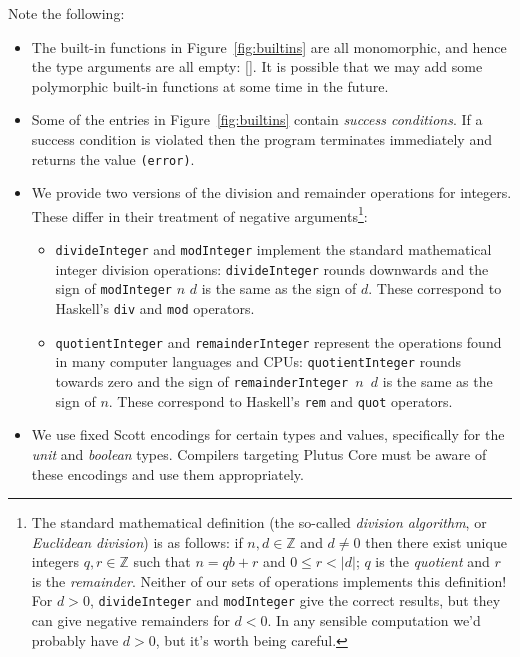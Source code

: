 \documentclass[a4paper]{article}
\begin{document}
Note the following:
\begin{itemize}
\item The built-in functions in Figure~\ref{fig:builtins}
are all monomorphic, and hence the type arguments are all empty: []. 
It is possible that we may add some polymorphic built-in functions
at some time in the future.
\item Some of the entries in Figure~\ref{fig:builtins}
  contain \textit{success conditions}.  If a success condition is
  violated then the program terminates immediately and returns
  the value \texttt{(error)}.
\item We provide two versions of the division and remainder operations
  for integers.  These differ in their treatment of negative
  arguments\footnote{The standard mathematical definition (the
    so-called \textit{division algorithm}, or \textit{Euclidean
      division}) is as follows: if $n,d \in \mathbb{Z}$ and $d \ne 0$
    then there exist unique integers $q, r \in \mathbb{Z}$ such that
    $n=qb+r$ and $0 \le r < \lvert d \rvert$; $q$ is the
    \textit{quotient} and $r$ is the \textit{remainder}.  Neither of
    our sets of operations implements this definition! For $d > 0$,
    \texttt{divideInteger} and \texttt{modInteger} give the correct
    results, but they can give negative remainders for $d<0$.  In any sensible
  computation we'd probably have $d>0$, but it's worth being careful.}:

  \begin{itemize}
  
  \item \texttt{divideInteger} and \texttt{modInteger} implement the
    standard mathematical integer division
    operations: \texttt{divideInteger} rounds downwards and the sign
    of \texttt{modInteger} $n$ $d$ is the same as the sign of $d$.
    These correspond to Haskell's \texttt{div} and \texttt{mod}
    operators.

  \item \texttt{quotientInteger} and \texttt{remainderInteger}
    represent the operations found in many computer languages and
    CPUs: \texttt{quotientInteger} rounds towards zero and the sign
    of \texttt{remainderInteger $n$ $d$} is the same as the sign of
    $n$.  These correspond to Haskell's \texttt{rem} and \texttt{quot}
    operators.  \end{itemize}

  
\item We use fixed Scott encodings for certain types and values, specifically for
  the \textit{unit} and \textit{boolean} types.  Compilers targeting
  Plutus Core must be aware of these encodings and use them
  appropriately.
\end{itemize}

\end{document}
